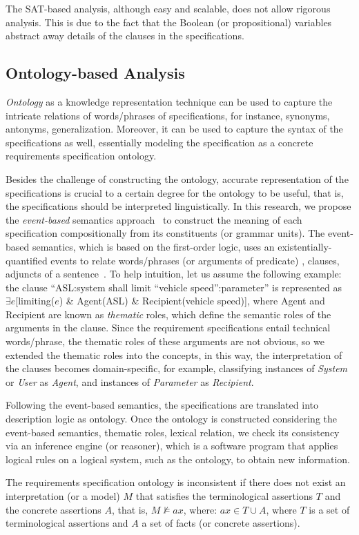 The SAT-based analysis, although easy and scalable, does not allow rigorous analysis. This is due to the fact that the Boolean (or propositional) variables abstract away details of the clauses in the specifications. %

\subsection*{Ontology-based Analysis}
\textit{Ontology} as a knowledge representation technique can be used to capture the intricate relations of words/phrases of specifications, for instance, synonyms, antonyms, generalization. Moreover, it can be used to capture the syntax of the specifications as well, essentially modeling the \resa{} specification as a concrete requirements specification ontology. 

Besides the challenge of constructing the ontology, accurate representation of the specifications is crucial to a certain degree for the ontology to be useful, that is, the specifications should be interpreted linguistically. In this research, we propose the \textit{event-based} semantics approach~\cite{Mahmud2017SpecificationLogic} to construct the meaning of each specification compositionally from its constituents (or grammar units). The event-based semantics, which is based on the first-order logic, uses an existentially-quantified events to relate words/phrases (or arguments of predicate) , clauses, adjuncts of a sentence~\cite{Mahmud2017SpecificationLogic}. To help intuition, let us assume the following example: the clause ``ASL:system shall limit ``vehicle speed'':parameter'' is represented as $\exists e$[limiting($e$) \& Agent(ASL) \& Recipient(vehicle speed)], where Agent and Recipient are known as \textit{thematic} roles, which define the semantic roles of the arguments in the clause.  Since the requirement specifications entail technical words/phrase, the thematic roles of these arguments are not obvious, so we extended the thematic roles into the \resa{} concepts, in this way, the interpretation of the clauses becomes domain-specific, for example, classifying instances of \textit{System} or \textit{User} as \textit{Agent}, and  instances of \textit{Parameter} as \textit{Recipient}.  

Following the event-based semantics, the \resa{} specifications are translated into description logic as ontology. Once the ontology is constructed considering the event-based semantics, thematic roles, lexical relation, we check its consistency via an inference engine (or reasoner), which is a software program that applies logical rules on a logical system, such as the ontology, to obtain new information.
\begin{definition}
	The requirements specification ontology is inconsistent if there does not exist an interpretation (or a model) $M$ that satisfies the terminological assertions $T$ and the concrete assertions $A$, that is, $M \not\models ax$, where: $ax \in T \cup A$, where $T$ is a set of terminological assertions and $A$  a set of facts (or concrete assertions).
\end{definition}

